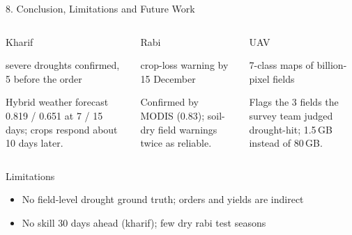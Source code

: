 \documentclass[aspectratio=169,10pt]{beamer}
\begin{document}
\begin{frame}{8. Conclusion, Limitations and Future Work}
\vspace{1mm}
\begin{columns}[T,onlytextwidth]
\begin{keycard}[equal height group=conc1]{Kharif}
\vspace{1pt}
{\scriptsize\color{muted} severe droughts confirmed, 5 before the order\par}\vspace{4pt}
\raggedright\scriptsize Hybrid weather forecast 0.819 / 0.651 at 7 / 15 days; crops respond about 10 days later.
\end{keycard}
\begin{keycard}[equal height group=conc1]{Rabi}
\vspace{1pt}
{\scriptsize\color{muted} crop-loss warning by 15 December\par}\vspace{4pt}
\raggedright\scriptsize Confirmed by MODIS (0.83); soil-dry field warnings twice as reliable.
\end{keycard}
\begin{keycard}[equal height group=conc1]{UAV}
\vspace{1pt}
{\scriptsize\color{muted} 7-class maps of billion-pixel fields\par}\vspace{4pt}
\raggedright\scriptsize Flags the 3 fields the survey team judged drought-hit; 1.5\,GB instead of 80\,GB.
\end{keycard}
\end{columns}
\vspace{3mm}
\begin{columns}[T,onlytextwidth]
\begin{warncard}[equal height group=conc2]{Limitations}
\scriptsize
\begin{itemize}
\item No field-level drought ground truth; orders and yields are indirect
\item No skill 30 days ahead (kharif); few dry rabi test seasons

\end{itemize}
\end{warncard}
\end{columns}
\end{frame}
\end{document}

